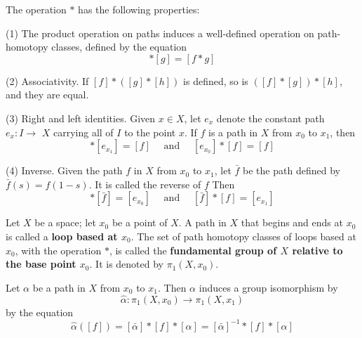\documentclass[12pt, a4paper, oneside]{book}
\begin{document}
\begin{theorem}
    The operation $*$ has the following properties:

    (1) The product operation on paths induces a well-defined operation on path-homotopy classes, defined by the equation
    \begin{equation*}
        [f] *[g]=[f * g]
    \end{equation*}

    (2) Associativity. If $[f] *([g] *[h])$ is defined, so is $([f] *[g]) *[h]$, and they are equal.


    (3) Right and left identities. Given $x \in X$, let $e_x$ denote the constant path $e_x : I \rightarrow$ $X$ carrying all of $I$ to the point $x$. If $f$ is a path in $X$ from $x_0$ to $x_1$, then
    \begin{equation*}
        [f] *\left[e_{x_1}\right]=[f] \quad \text { and } \quad\left[e_{x_0}\right] *[f]=[f]
    \end{equation*}

    (4) Inverse. Given the path $f$ in $X$ from $x_0$ to $x_1$, let $\bar{f}$ be the path defined by $\bar{f}(s)=f(1-s)$. It is called the reverse of $f$ Then
    \begin{equation*}
        [f] *[\bar{f}]=\left[e_{x_0}\right] \quad \text { and } \quad[\bar{f}] *[f]=\left[e_{x_1}\right]
    \end{equation*}
\end{theorem}


\begin{definition}
    Let $X$ be a space; let $x_0$ be a point of $X$.
    A path in $X$ that begins and ends at $x_0$ is called a \textbf{loop based at $x_0$}.
    The set of path homotopy classes of loops based at $x_0$, with the operation $*$, is called the \textbf{fundamental group of $X$ relative to the base point $x_0$}. It is denoted by $\pi_1\left(X, x_0\right)$.
\end{definition}



\begin{theorem}
    Let $\alpha$ be a path in $X$ from $x_0$ to $x_1$. Then $\alpha$ induces a group isomorphism by
    \begin{equation*}
        \hat{\alpha}: \pi_1\left(X, x_0\right) \longrightarrow \pi_1\left(X, x_1\right)
    \end{equation*}
    by the equation
    \begin{equation*}
        \hat{\alpha}([f])
        =
        [\bar{\alpha}] *[f] *[\alpha]
        =
        [\bar{\alpha}]^{-1} *[f] *[\alpha]
    \end{equation*}
\end{theorem}
\end{document}
